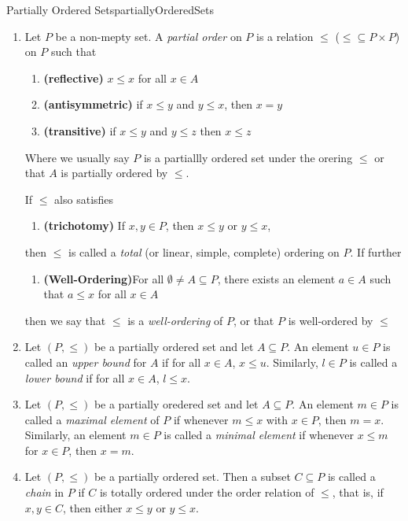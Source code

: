 \documentclass[oneside]{book}
\newcommand{\sse}{\subseteq}
\begin{document}
\begin{defn}{Partially Ordered Sets}{partiallyOrderedSets}
	\begin{enumerate}
		\item Let $P$ be a non-mepty set. A \emph{partial order} on $P$ is a relation $\le$ ($\le \sse P\times P$) on $P$ such that
			\begin{enumerate}
				\item \textbf{(reflective)} $x \le x$ for all $x \in A$
				\item \textbf{(antisymmetric)} if $x \le y$ and $y \le x$, then $x = y$
				\item \textbf{(transitive)} if $x \le y$ and $y \le z$ then $x \le z$
			\end{enumerate}
			Where we usually say $P$ is a partiallly ordered set under the orering $\le$ or that $A$ is partially
			ordered by $\le$.

			If $\le$ also satisfies
			\begin{enumerate}
				\item[(d)] \textbf{(trichotomy)} If $x,y \in P$, then $x \le y$ or $y \le x$,
			\end{enumerate}
			then $\le$ is called a \emph{total} (or linear, simple, complete) ordering on $P$. If further
			\begin{enumerate}
				\item[(e)] \textbf{(Well-Ordering)}For all $\emptyset \ne A \sse P$, there exists an element $a \in A$ such that $a \le x$ for
					all $x \in A$
			\end{enumerate}
			then we say that $\le$ is a \emph{well-ordering} of $P$, or that $P$ is well-ordered by $\le$
		\item Let $(P, \le)$ be a partially ordered set and let  $A \sse P$. An element $u\in P$ is called an \emph{upper bound}
			  for $A$ if for all $x \in A$, $x \le u$. Similarly, $l \in P$ is called a \emph{lower bound} if for all $x \in A$,
			  $l \le x$.

	    \item Let $(P, \le)$ be a partially oredered set and let $A \sse P$. An element $m \in P$ is called a \emph{maximal element
		  } of $P$ if whenever $m \le x$ with $x \in P$, then $m = x$. Similarly, an element $m \in P$ is called
		  a \emph{minimal element} if whenever $x \le m$ for $x \in P$, then $x = m$.
	  \item Let $(P, \le)$ be a partially ordered set. Then a subset $C \sse P$ is called a \emph{chain} in $P$ if $C$
		  is totally ordered under the order relation of $\le$, that is, if $x,y \in C$, then either $x \le y$ or $y
		  \le x$.
	\end{enumerate}
\end{defn}
\end{document}
